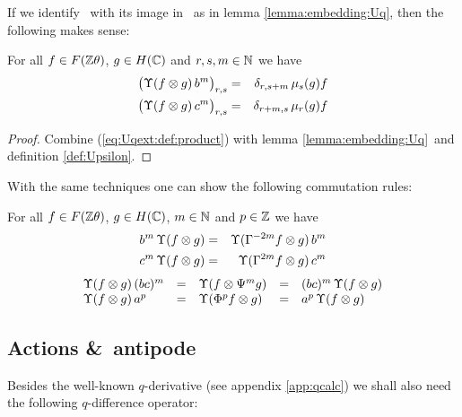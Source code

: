 If we identify \Uq\ with its image in \Uqext\ as in lemma \ref{lemma:embedding:Uq},
then the following makes sense:

\begin{lemma} \label{lemma:Upsilon}
For all\/ $f\in F(\mathbb{Z} \theta)$, $g\in H(\mathbb{C})$ and\/ $r,s,m \in \mathbb{N}$ we have
\begin{eqnarray*}
  \left( \Upsilon(f \tens g)\,b^m  \vertM\right)_{r,s}
            &=& \delta_{r,s+m} \,\mu_s(g) f  \\
  \left( \Upsilon(f \tens g)\,c^m  \vertM\right)_{r,s}
            &=& \delta_{r+m,s} \, \mu_r(g) f
\end{eqnarray*}
\end{lemma}

\begin{proof}
  Combine (\ref{eq:Uqext:def:product}) with lemma
  \ref{lemma:embedding:Uq}\ and definition \ref{def:Upsilon}.
\end{proof}
\vspace{2ex}


With the same techniques one can show the following commutation rules:

\begin{prop} \label{prop:Upsilon:commutation_rules}
For all\/ $f\in F(\mathbb{Z} \theta)$, $g\in H(\mathbb{C})$, $m \in \mathbb{N}$ and\/ $p\in \mathbb{Z}$ we have
\begin{eqnarray*}
   b^m \, \Upsilon(f \otimes g) &=& \Upsilon(\Gamma^{-2m} f \otimes g)\, b^m \\
   c^m \, \Upsilon(f \otimes g) &=& \Upsilon(\Gamma^{2m} f \otimes g) \,c^m
\end{eqnarray*}
\begin{equation} \label{eq:Upsilon:commutation_rules}
 \begin{array}{lclcl}
   \Upsilon(f \otimes g)\,(bc)^m
         &=&   \Upsilon(f \otimes \Psi^m g)
         &=&   (bc)^m\, \Upsilon(f \otimes g)  \\
   \Upsilon(f \otimes g)\,a^p
         &=&   \Upsilon(\Phi^p f \otimes g)
         &=&    a^p\, \Upsilon(f \otimes g)
\end{array}
\end{equation}
\end{prop}




\subsection{Actions \&\ antipode}

Besides the well-known $q$-derivative (see appendix \ref{app:qcalc}) we shall
also need the following $q$-difference operator:

